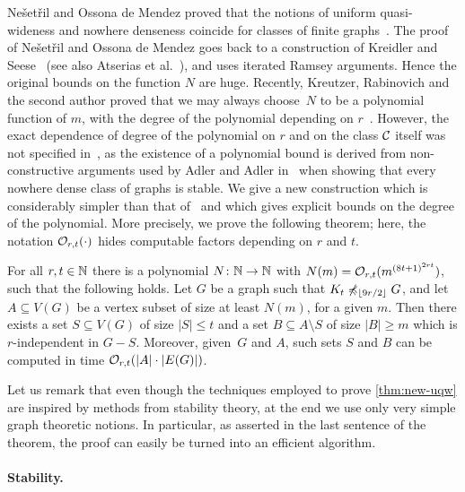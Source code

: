 Ne\v{s}et\v{r}il and Ossona de Mendez proved that
the notions of uniform quasi-wideness and nowhere denseness coincide for 
classes of finite graphs~\cite{nevsetvril2011nowhere}. 
The proof of Ne\v{s}et\v{r}il 
and Ossona de Mendez goes back to a construction
of Kreidler and Seese~\cite{kreidler1998monadic} (see also Atserias et al.~\cite{atserias2006preservation}), 
and uses iterated Ramsey arguments. Hence the original bounds on 
the function $N$ are huge. Recently, Kreutzer, Rabinovich and the second author
 proved that we may always choose~$N$ to be a polynomial 
function of $m$, with the degree of the polynomial depending on $r$~\cite{siebertz2016polynomial}. However, the exact dependence of degree of the polynomial on $r$ and on the class $\mathcal{C}$ itself
 was  not specified in~\cite{siebertz2016polynomial}, as the existence of a polynomial bound is derived
from non-constructive arguments used by Adler and Adler in~\cite{adler2014interpreting} when showing that every nowhere dense class of graphs
is stable. We give a new construction 
which is considerably simpler than that of~\cite{siebertz2016polynomial}
and which gives explicit bounds on the degree of the polynomial. 
More precisely, we prove the following theorem; here, the notation $\mathcal{O}_{r,t}(\cdot)$ hides computable factors depending on $r$ and $t$.

\begin{theorem}\label{thm:new-uqw}
For all $r,t\in \mathbb{N}$ there is a polynomial  $N\colon \mathbb{N}\to \mathbb{N}$ with $N(m)=
\mathcal{O}_{r,t}{(m^{{(8t+1)}^{2rt}})}$, such that the following holds.
Let $G$ be a graph such that $K_t\not\preccurlyeq_{\lfloor 9r/2\rfloor} G$, and
let $A\subseteq V(G)$ be a vertex subset of size at least $N(m)$, for a given $m$.
Then there exists a set $S\subseteq V(G)$ of size $|S|\leq t$ and a set $B\subseteq A\setminus S$ 
of size $|B|\geq m$ which is $r$-independent in $G-S$.
Moreover, given~$G$ and $A$, such sets $S$ and $B$ can be computed in time $\mathcal{O}_{r,t}(|A|\cdot |E(G)|)$. 
\end{theorem}

Let us remark
that even though the techniques employed to prove \cref{thm:new-uqw} are inspired by methods from stability theory, 
at the end we use only very simple graph theoretic notions. In particular, as asserted in the last sentence of the theorem, the
proof can easily be turned into an efficient algorithm.

\paragraph{Stability.}


